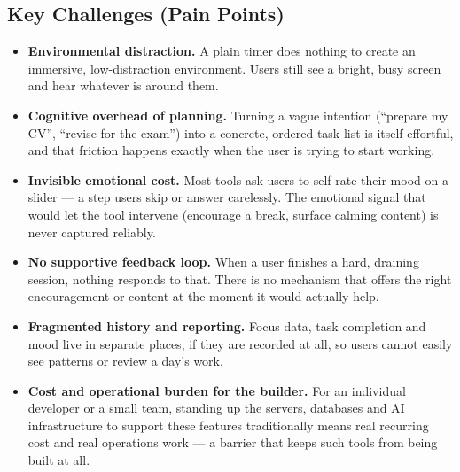 \documentclass[a4paper,11pt]{article}
\begin{document}
	\subsection{Key Challenges (Pain Points)}
	\begin{itemize}
		\item \textbf{Environmental distraction.} A plain timer does nothing to create an
		      immersive, low-distraction environment. Users still see a bright, busy screen and
		      hear whatever is around them.
		\item \textbf{Cognitive overhead of planning.} Turning a vague intention
		      (``prepare my CV'', ``revise for the exam'') into a concrete, ordered task list
		      is itself effortful, and that friction happens exactly when the user is trying to
		      start working.
		\item \textbf{Invisible emotional cost.} Most tools ask users to self-rate their mood on
		      a slider --- a step users skip or answer carelessly. The emotional signal that
		      would let the tool intervene (encourage a break, surface calming content) is never
		      captured reliably.
		\item \textbf{No supportive feedback loop.} When a user finishes a hard, draining
		      session, nothing responds to that. There is no mechanism that offers the right
		      encouragement or content at the moment it would actually help.
		\item \textbf{Fragmented history and reporting.} Focus data, task completion and mood
		      live in separate places, if they are recorded at all, so users cannot easily see
		      patterns or review a day's work.
		\item \textbf{Cost and operational burden for the builder.} For an individual developer
		      or a small team, standing up the servers, databases and AI infrastructure to
		      support these features traditionally means real recurring cost and real operations
		      work --- a barrier that keeps such tools from being built at all.
	\end{itemize}
\end{document}
